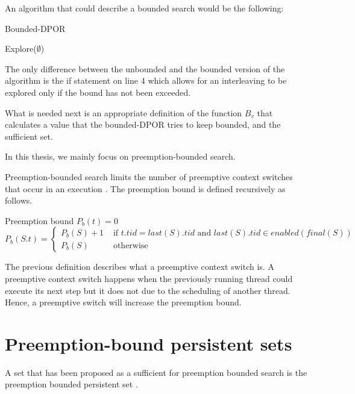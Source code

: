 An algorithm that could describe a bounded search would be the following:

\begin{algorithm}[H]
    \caption{Bounded-DPOR}
    Explore($\emptyset$)\;
\end{algorithm}

\noindent The only difference between the unbounded and the bounded version of the algorithm is the if statement on line 4 which allows for an interleaving to be explored
only if the bound has not been exceeded.

What is needed next is an appropriate definition of the function $B_v$ that calculates a value that the bounded-DPOR tries to keep bounded, 
and the sufficient set. 

In this thesis, we mainly focus on preemption-bounded search. 

Preemption-bounded search limits the number of preemptive context switches that occur in an execution \cite{Musu07}. The 
preemption bound is defined recursively as follows.

\begin{definition}{Preemption bound}
$P_b(t) = 0$ \\
$P_b(S.t) = 
 \begin{cases} 
    P_b(S) + 1 & \text{ if } t.tid = last(S).tid \text{ and } last(S).tid \in enabled(final(S)) \\
    P_b(S) & \text{ otherwise }
 \end{cases}
$\\
\end{definition}

The previous definition describes what a preemptive context switch is. A preemptive context switch happens when the previously running thread could execute
its next step but it does not due to the scheduling of another thread. Hence, a preemptive switch will increase the preemption bound.

\section{Preemption-bound persistent sets}

A set that has been proposed as a sufficient for preemption bounded search is the preemption bounded persistent set \cite{BPOR}.

